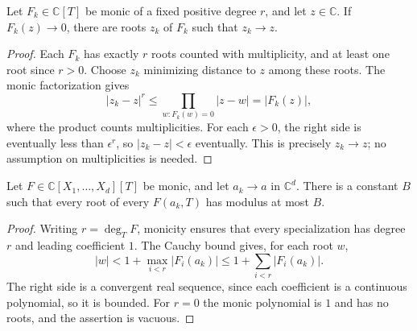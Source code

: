 \begin{lemma}
\label{lem:complex-closure-root-persistence}
\leanok
Let $F_k\in\mathbb C[T]$ be monic of a fixed positive degree $r$, and
let $z\in\mathbb C$. If $F_k(z)\to0$, there are roots $z_k$ of $F_k$
such that $z_k\to z$.
\end{lemma}
\begin{proof}
Each $F_k$ has exactly $r$ roots counted with multiplicity, and at least
one root since $r>0$. Choose $z_k$ minimizing distance to $z$ among
these roots. The monic factorization gives
\[
 |z_k-z|^r\leq\prod_{w:F_k(w)=0}|z-w|=|F_k(z)|,
\]
where the product counts multiplicities. For each $\epsilon>0$, the
right side is eventually less than $\epsilon^r$, so
$|z_k-z|<\epsilon$ eventually. This is precisely $z_k\to z$;
no assumption on multiplicities is needed.
\end{proof}

\begin{lemma}
\label{lem:complex-closure-root-bounds}
\leanok
Let $F\in\mathbb C[X_1,\ldots,X_d][T]$ be monic, and let
$a_k\to a$ in $\mathbb C^d$. There is a constant $B$ such that every
root of every $F(a_k,T)$ has modulus at most $B$.
\end{lemma}
\begin{proof}
Writing $r=\deg_T F$, monicity ensures that every specialization has
degree $r$ and leading coefficient $1$. The Cauchy bound gives, for each
root $w$,
\[
 |w|<1+\max_{i<r}|F_i(a_k)|
       \leq 1+\sum_{i<r}|F_i(a_k)|.
\]
The right side is a convergent real sequence, since each coefficient is
a continuous polynomial, so it is bounded. For $r=0$ the monic polynomial
is $1$ and has no roots, and the assertion is vacuous.
\end{proof}

